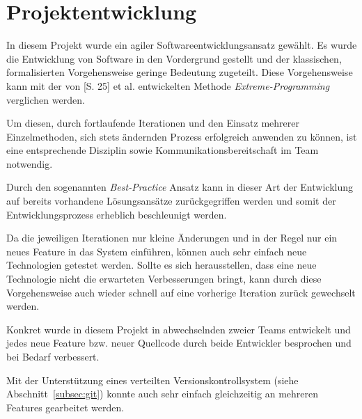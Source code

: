 \section{Projektentwicklung}
\label{sec:development}

In diesem Projekt wurde ein agiler Softwareentwicklungsansatz gewählt. Es wurde
	die Entwicklung von Software in den Vordergrund gestellt und der klassischen,
	formalisierten Vorgehensweise geringe Bedeutung zugeteilt. Diese Vorgehensweise
	kann mit der von \cite{Beck98}[S. 25] et al. entwickelten Methode
	\emph{Extreme-Programming} verglichen werden.
	
Um diesen, durch fortlaufende Iterationen und den Einsatz mehrerer Einzelmethoden,
	sich stets ändernden Prozess erfolgreich anwenden zu können, ist eine entsprechende
	Disziplin sowie Kommunikationsbereitschaft im Team notwendig.
	
Durch den sogenannten \emph{Best-Practice} Ansatz kann in dieser Art der Entwicklung
	auf bereits vorhandene Lösungsansätze zurückgegriffen werden und somit der
	Entwicklungsprozess erheblich beschleunigt werden.
	
Da die jeweiligen Iterationen nur kleine Änderungen und in der Regel nur ein neues
	Feature in das System einführen, können auch sehr einfach neue Technologien
	getestet werden. Sollte es sich herausstellen, dass eine neue Technologie nicht
	die erwarteten Verbesserungen bringt, kann durch diese Vorgehensweise auch wieder
	schnell auf eine vorherige Iteration zurück gewechselt werden.
	
Konkret wurde in diesem Projekt in abwechselnden zweier Teams entwickelt und jedes
	neue Feature bzw. neuer Quellcode durch beide Entwickler besprochen und bei
	Bedarf verbessert.
	
Mit der Unterstützung eines verteilten Versionskontrollsystem (siehe
	Abschnitt~\ref{subsec:git}) konnte auch sehr einfach gleichzeitig an mehreren
	Features gearbeitet werden.